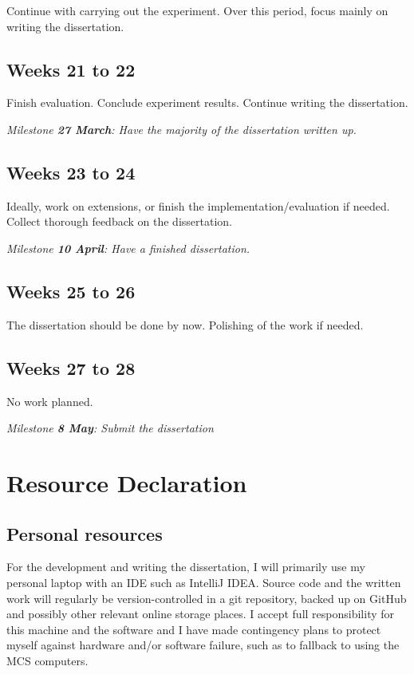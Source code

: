 Continue with carrying out the experiment. Over this period, focus mainly on writing the dissertation.


\subsection*{Weeks 21 to 22}

Finish evaluation. Conclude experiment results. Continue writing the dissertation.

\textit{Milestone \textbf{27 March}: Have the majority of the dissertation written up.}

\subsection*{Weeks 23 to 24}

Ideally, work on extensions, or finish the implementation/evaluation if needed. Collect thorough feedback on the dissertation.

\textit{Milestone \textbf{10 April}: Have a finished dissertation.}

\subsection*{Weeks 25 to 26}

The dissertation should be done by now. Polishing of the work if needed.


\subsection*{Weeks 27 to 28}

No work planned.

\textit{Milestone \textbf{8 May}: Submit the dissertation}

\section*{Resource Declaration}\label{sec:resourcedeclaration}

\subsection*{Personal resources}

For the development and writing the dissertation, I will primarily use my personal laptop with an IDE such as IntelliJ IDEA. Source code and the written work will regularly be version-controlled in a git repository, backed up on GitHub and possibly other relevant online storage places. I accept full responsibility for this machine and the software and I have made contingency plans to protect myself against hardware and/or software failure, such as to fallback to using the MCS computers.

